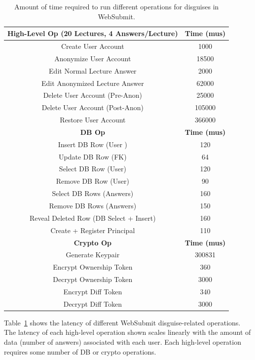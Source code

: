 \begin{table}[t!]
\begin{center}
\begin{tabular}{ c c }
    \textbf{High-Level Op (20 Lectures, 4 Answers/Lecture)} & \textbf{Time (mus)}\\
\hline
    Create User Account & 1000\\
    Anonymize User Account & 18500\\
    Edit Normal Lecture Answer & 2000 \\
    Edit Anonymized Lecture Answer & 62000 \\
    Delete User Account (Pre-Anon) & 25000 \\
    Delete User Account (Post-Anon) & 105000 \\
    Restore User Account & 366000 \\
\hline
    \textbf{DB Op} & \textbf{Time (mus)}\\
\hline
Insert DB Row (User )& 120\\
Update DB Row (FK) & 64\\ 
Select DB Row (User) & 120\\
Remove DB Row (User) & 90\\
Select DB Rows (Answers) & 160\\
Remove DB Rows (Answers) & 150\\
Reveal Deleted Row (DB Select + Insert) & 160 \\
Create + Register Principal & 110\\
\hline
    \textbf{Crypto Op} & \textbf{Time (mus)}\\
\hline
Generate Keypair & 300831\\
Encrypt Ownership Token & 360\\
Decrypt Ownership Token & 3000\\
Encrypt Diff Token & 340\\
Decrypt Diff Token & 3000\\
\end{tabular}
\end{center}
\caption{Amount of time required to run different operations for disguises in WebSubmit.}
    \label{tab:opstats}
\end{table}

Table~\ref{tab:opstats} shows the latency of different WebSubmit disguise-related operations. 
The latency of each high-level operation shown scales linearly with the amount
of data (\ie number of answers) associated with each user. Each high-level operation requires some number of DB or crypto operations.

